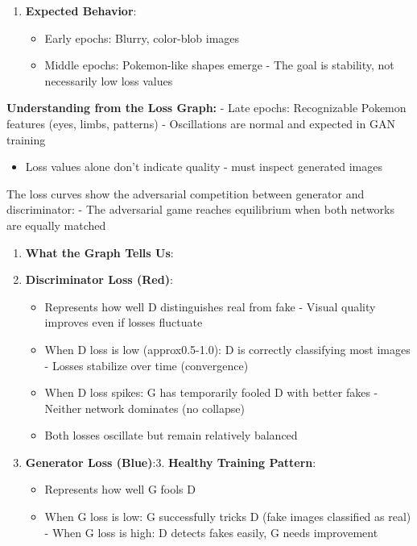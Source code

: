 \documentclass[11pt]{article}
\providecommand{\tightlist}{%
      \setlength{\itemsep}{0pt}\setlength{\parskip}{0pt}}
\begin{document}
\begin{enumerate}
  \begin{itemize}
  \tightlist
  \item
    Adam optimizer with \(\beta\)\(_1\)=0.5 (lower than typical 0.9)
  \item
    Helps with GAN training stability
  \item
    Learning rate: 0.0005
  \end{itemize}
\item
  \textbf{Expected Behavior}:

  \begin{itemize}
  \item
    Early epochs: Blurry, color-blob images
  \item
    Middle epochs: Pokemon-like shapes emerge - The goal is stability,
    not necessarily low loss values
  \end{itemize}
\end{enumerate}

\textbf{Understanding from the Loss Graph:} - Late epochs: Recognizable
Pokemon features (eyes, limbs, patterns) - Oscillations are normal and
expected in GAN training

\begin{itemize}
\tightlist
\item
  Loss values alone don't indicate quality - must inspect generated
  images
\end{itemize}

The loss curves show the adversarial competition between generator and
discriminator: - The adversarial game reaches equilibrium when both
networks are equally matched

\begin{enumerate}
\def\labelenumi{\arabic{enumi}.}
\setcounter{enumi}{3}
\item
  \textbf{What the Graph Tells Us}:
\item
  \textbf{Discriminator Loss (Red)}:

  \begin{itemize}
  \item
    Represents how well D distinguishes real from fake - Visual quality
    improves even if losses fluctuate
  \item
    When D loss is low (approx0.5-1.0): D is correctly classifying most
    images - Losses stabilize over time (convergence)
  \item
    When D loss spikes: G has temporarily fooled D with better fakes -
    Neither network dominates (no collapse)
  \item
    Both losses oscillate but remain relatively balanced
  \end{itemize}
\item
  \textbf{Generator Loss (Blue)}:3. \textbf{Healthy Training Pattern}:

  \begin{itemize}
  \item
    Represents how well G fools D
  \item
    When G loss is low: G successfully tricks D (fake images classified
    as real) - When G loss is high: D detects fakes easily, G needs
    improvement
  \end{itemize}
\end{enumerate}
\end{document}
